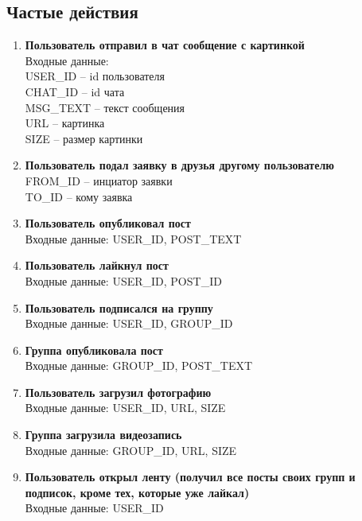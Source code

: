 \documentclass[12pt, a4paper] {ncc}
\begin{document}
\subsection{Частые действия}
\begin{enumerate}
\item \textbf{Пользователь отправил в чат сообщение с картинкой} \\
Входные данные: \\
USER\_ID -- id пользователя\\
CHAT\_ID -- id чата\\
MSG\_TEXT -- текст сообщения\\
URL -- картинка\\
SIZE -- размер картинки

\item \textbf{Пользователь подал заявку в друзья другому пользователю} \\
FROM\_ID -- инциатор заявки \\
TO\_ID -- кому заявка

\item \textbf{Пользователь опубликовал пост} \\
Входные данные: USER\_ID, POST\_TEXT

\item \textbf{Пользователь лайкнул пост} \\
Входные данные: USER\_ID, POST\_ID

\item \textbf{Пользователь подписался на группу} \\
Входные данные: USER\_ID, GROUP\_ID

\item \textbf{Группа опубликовала пост} \\
Входные данные: GROUP\_ID, POST\_TEXT

\item \textbf{Пользователь загрузил фотографию} \\
Входные данные: USER\_ID, URL, SIZE

\item \textbf{Группа загрузила видеозапись} \\
Входные данные: GROUP\_ID, URL, SIZE

\item \textbf{Пользователь открыл ленту (получил все посты своих групп и подписок, кроме тех, которые уже лайкал)} \\
Входные данные: USER\_ID

\end{enumerate}
\end{document}
